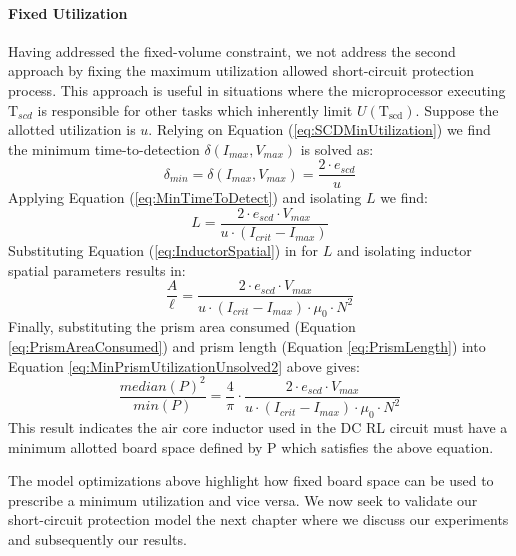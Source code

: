 \paragraph{Fixed Utilization}
Having addressed the fixed-volume constraint, we not address the second approach by fixing the maximum utilization allowed short-circuit protection process.
This approach is useful in situations where the microprocessor executing $\mathrm{T}_{scd}$ is responsible for other tasks which inherently limit $U(\mathrm{T_{scd}})$. Suppose the allotted utilization is $u$. Relying on Equation (\ref{eq:SCDMinUtilization}) we find the minimum time-to-detection $\delta(I_{max},V_{max})$ is solved as:
\begin{equation}\label{eq:MinTimeToDetectSpatial}
\delta_{min} = \delta(I_{max},V_{max}) = \frac{2 \cdot e_{scd}}{u} \nonumber
\end{equation}
Applying Equation (\ref{eq:MinTimeToDetect}) and isolating $L$ we find:
\begin{equation}\label{eq:InductorFixedUtilization}
L = \frac{2 \cdot e_{scd} \cdot V_{max}}{u \cdot (I_{crit}-I_{max})} \nonumber
\end{equation}
Substituting Equation (\ref{eq:InductorSpatial}) in for $L$ 
and isolating inductor spatial parameters results in:
\begin{equation}\label{eq:MinPrismUtilizationUnsolved2}
\frac{A}{\ell} = \frac{2 \cdot e_{scd} \cdot V_{max}}{u \cdot (I_{crit}-I_{max}) \cdot \mu_0 \cdot N^{2}} \nonumber
\end{equation}
Finally, substituting the prism area consumed (Equation \ref{eq:PrismAreaConsumed}) and prism length (Equation \ref{eq:PrismLength}) into Equation \ref{eq:MinPrismUtilizationUnsolved2} above gives:
\begin{equation}\label{eq:MinPrismUtilization}
\frac{median(P)^{2}}{min(P)} = \frac{4}{\pi} \cdot \frac{ 2 \cdot e_{scd} \cdot V_{max}}{u \cdot (I_{crit}-I_{max}) \cdot \mu_0 \cdot N^{2}}
\end{equation}
This result indicates the air core inductor used in the DC RL circuit must have a minimum allotted board space defined by P which satisfies the above equation.

The model optimizations above highlight how fixed board space can be used to prescribe a minimum utilization and vice versa. We now seek to validate our short-circuit protection model the next chapter where we discuss our experiments and subsequently our results.

